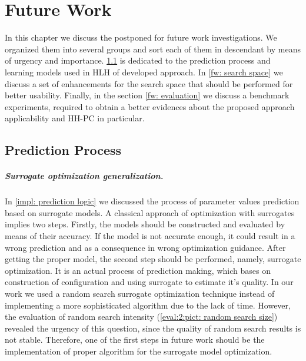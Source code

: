 \chapter{Future Work}\label{future work}
In this chapter we discuss the postponed for future work investigations. We organized them into several groups and sort each of them in descendant by means of urgency and importance. \cref{fw: prediction process} is dedicated to the prediction process and learning models used in HLH of developed approach. In \cref{fw: search space} we discuss a set of enhancements for the search space that should be performed for better usability. Finally, in the section \cref{fw: evaluation} we discuss a benchmark experiments, required to obtain a better evidences about the proposed approach applicability and HH-PC in particular.


\section{Prediction Process}\label{fw: prediction process}
\paragraph{Surrogate optimization generalization.} In \cref{impl: prediction logic} we discussed the process of parameter values prediction based on surrogate models. A classical approach of optimization with surrogates implies two steps. Firstly, the models should be constructed and evaluated by means of their accuracy. If the model is not accurate enough, it could result in a wrong prediction and as a consequence in wrong optimization guidance. After getting the proper model, the second step should be performed, namely, surrogate optimization. It is an actual process of prediction making, which bases on construction of configuration and using surrogate to estimate it's quality. In our work we used a random search surrogate optimization technique instead of implementing a more sophisticated algorithm due to the lack of time. However, the evaluation of random search intensity (\cref{eval:2:pict: random search size}) revealed the urgency of this question, since the quality of random search results is not stable. Therefore, one of the first steps in future work should be the implementation of proper algorithm for the surrogate model optimization.


